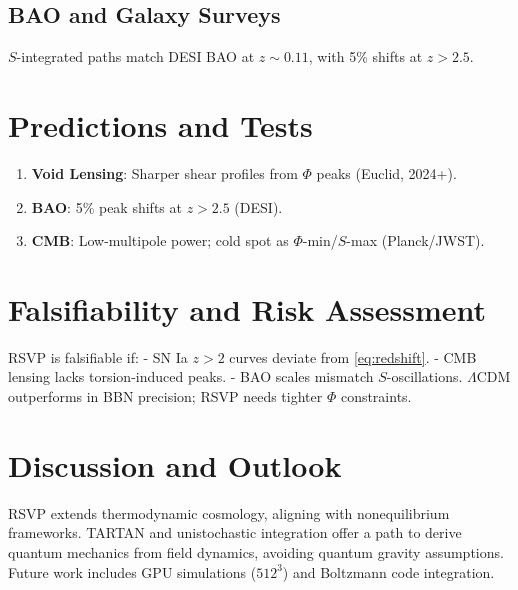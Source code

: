 \documentclass[11pt]{article}
\theoremstyle{plain}
\theoremstyle{definition}
\begin{document}
\subsection{BAO and Galaxy Surveys}
$S$-integrated paths match DESI BAO at $z \sim 0.11$, with 5\% shifts at $z > 2.5$.

\section{Predictions and Tests}
\label{sec:predictions}
\begin{enumerate}
    \item \textbf{Void Lensing}: Sharper shear profiles from $\Phi$ peaks (Euclid, 2024+).
    \item \textbf{BAO}: 5\% peak shifts at $z > 2.5$ (DESI).
    \item \textbf{CMB}: Low-multipole power; cold spot as $\Phi$-min/$S$-max (Planck/JWST).
\end{enumerate}

\section{Falsifiability and Risk Assessment}
\label{sec:falsifiability}
RSVP is falsifiable if:
- SN Ia $z > 2$ curves deviate from \eqref{eq:redshift}.
- CMB lensing lacks torsion-induced peaks.
- BAO scales mismatch $S$-oscillations.
$\Lambda$CDM outperforms in BBN precision; RSVP needs tighter $\Phi$ constraints.

\section{Discussion and Outlook}
\label{sec:discussion}
RSVP extends thermodynamic cosmology, aligning with nonequilibrium frameworks. TARTAN and unistochastic integration offer a path to derive quantum mechanics from field dynamics, avoiding quantum gravity assumptions. Future work includes GPU simulations ($512^3$) and Boltzmann code integration.



\end{document}
